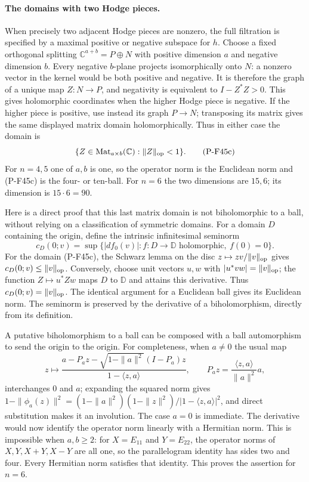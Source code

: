 \paragraph{The domains with two Hodge pieces.}
When precisely two adjacent Hodge pieces are nonzero,
the full filtration is specified by a maximal positive
or negative subspace for $h$. Choose a fixed orthogonal
splitting $\mathbb C^{a+b}=P\oplus N$ with positive
dimension $a$ and negative dimension $b$. Every negative
$b$-plane projects isomorphically onto $N$: a nonzero
vector in the kernel would be both positive and negative.
It is therefore the graph of a unique map $Z:N\to P$,
and negativity is equivalent to $I-Z^*Z>0$. This gives
holomorphic coordinates when the higher Hodge piece is
negative. If the higher piece is positive, use instead
its graph $P\to N$; transposing its matrix gives the
same displayed matrix domain holomorphically. Thus in
either case the domain is
\[
              \{Z\in\operatorname{Mat}_{a\times b}(\mathbb C):
                        \|Z\|_{\rm op}<1\}.
 \tag{P-F45c}
\]
For $n=4,5$ one of $a,b$ is one, so the operator norm is
the Euclidean norm and (P-F45c) is the four- or ten-ball.
For $n=6$ the two dimensions are $15,6$; its dimension
is $15\cdot6=90$.

Here is a direct proof that this last matrix domain is
not biholomorphic to a ball, without relying on a
classification of symmetric domains. For a domain $D$
containing the origin, define the intrinsic infinitesimal
seminorm
\[
 c_D(0;v)=\sup\{|df_0(v)|:f:D\to\mathbb D
                  \text{ holomorphic},\ f(0)=0\}.
\]
For the domain (P-F45c), the Schwarz lemma on the disc
$z\mapsto z v/\|v\|_{\rm op}$ gives
$c_D(0;v)\le\|v\|_{\rm op}$. Conversely, choose unit
vectors $u,w$ with $|u^*vw|=\|v\|_{\rm op}$; the function
$Z\mapsto u^*Zw$ maps $D$ to $\mathbb D$ and attains
this derivative. Thus $c_D(0;v)=\|v\|_{\rm op}$.
The identical argument for a Euclidean ball gives its
Euclidean norm. The seminorm is preserved by the
derivative of a biholomorphism, directly from its definition.

A putative biholomorphism to a ball can be composed with
a ball automorphism to send the origin to the origin.
For completeness, when $a\ne0$ the usual map
\[
 z\longmapsto
 \frac{a-P_a z-\sqrt{1-\|a\|^2}(I-P_a)z}
      {1-\langle z,a\rangle},
 \qquad P_a z=\frac{\langle z,a\rangle}{\|a\|^2}a,
\]
interchanges $0$ and $a$; expanding the squared norm
gives
$1-\|\phi_a(z)\|^2=(1-\|a\|^2)(1-\|z\|^2)
/|1-\langle z,a\rangle|^2$, and direct substitution makes
it an involution. The case $a=0$ is immediate.
The derivative would now identify the operator norm
linearly with a Hermitian norm. This is impossible when
$a,b\ge2$: for $X=E_{11}$ and $Y=E_{22}$, the operator
norms of $X,Y,X+Y,X-Y$ are all one, so the parallelogram
identity has sides two and four. Every Hermitian norm
satisfies that identity. This proves the assertion for
$n=6$.

